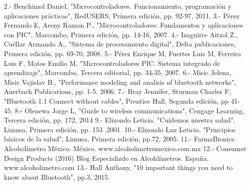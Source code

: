 2.- Benchimol Daniel, "Microcontroladores. Funcionamiento, programación y aplicaciones prácticas", RedUSERS, Primera edición, pp. 92-97, 2011.
3.- Pérez Fernando E, Areny Ramon P., "Microcontroladores: Fundamentos y aplicaciones con PIC", Marcombo, Primera edición, pp. 14-16, 2007.
4.- Izaguirre Aitzol Z., Cuéllar Armando A., "Sistema de procesamiento digital", Delta publicaciones, Primera edición, pp. 69-70, 2008.
5.- Pérez Enrique M, Fuertes Luis M, Ferreira Luis F, Matos Emilio M, "Microcontroladores PIC. Sistema integrado de aprendizaje", Marcombo, Tercera editorial, pp. 34-35, 2007.
6.- Misic Jelena, Misic Vojislav B., "Performance modeling and analisis of bluetooth networks", Auerbach Publications, pp. 1-5, 2006.
7.- Bray Jennifer, Sturman Charles F, "Bluetooth 1.1 Connect without cables", Prentice Hall, Segunda edición, pp 41-45.
8.- Olenewa Jorge L, "Guide to wireless communications", Cengage Learning, Tercera edición, pp. 172, 2014
9.- Elizondo Leticia. "Cuidemos nuestra salud", Limusa, Primera edición, pp. 153 ,2001.
10.- Elizondo Luz Leticia. "Principios básicos de la salud", Limusa, Primera edición, pp.72, 2005.
11.- FarmaBionics. Alcoholímetro México. México.  www.alcoholimetromexico.com.mx
12.- Consumer Design Products (2016) Blog Especializdo en Alcohlímetros. España. www.alcoholimetro.com
13.- Hall Anthony, "10 important things you need to know about Bluetooth", pp.3, 2015.
